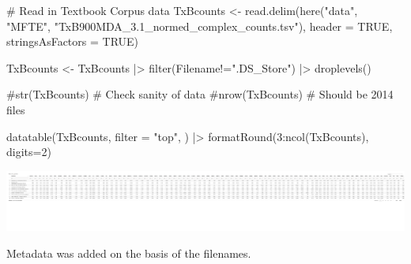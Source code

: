 \documentclass[
  letterpaper,
  DIV=11,
  numbers=noendperiod]{scrreprt}
\newenvironment{Shaded}{\begin{snugshade}}{\end{snugshade}}
\newcommand{\AttributeTok}[1]{\textcolor[rgb]{0.40,0.45,0.13}{#1}}
\newcommand{\CommentTok}[1]{\textcolor[rgb]{0.37,0.37,0.37}{#1}}
\newcommand{\ConstantTok}[1]{\textcolor[rgb]{0.56,0.35,0.01}{#1}}
\newcommand{\DecValTok}[1]{\textcolor[rgb]{0.68,0.00,0.00}{#1}}
\newcommand{\FunctionTok}[1]{\textcolor[rgb]{0.28,0.35,0.67}{#1}}
\newcommand{\NormalTok}[1]{\textcolor[rgb]{0.00,0.23,0.31}{#1}}
\newcommand{\OtherTok}[1]{\textcolor[rgb]{0.00,0.23,0.31}{#1}}
\newcommand{\SpecialCharTok}[1]{\textcolor[rgb]{0.37,0.37,0.37}{#1}}
\newcommand{\StringTok}[1]{\textcolor[rgb]{0.13,0.47,0.30}{#1}}
\begin{document}
\begin{Shaded}
\begin{Highlighting}[]
\CommentTok{\# Read in Textbook Corpus data}
\NormalTok{TxBcounts }\OtherTok{\textless{}{-}} \FunctionTok{read.delim}\NormalTok{(}\FunctionTok{here}\NormalTok{(}\StringTok{"data"}\NormalTok{, }\StringTok{"MFTE"}\NormalTok{, }\StringTok{"TxB900MDA\_3.1\_normed\_complex\_counts.tsv"}\NormalTok{), }\AttributeTok{header =} \ConstantTok{TRUE}\NormalTok{, }\AttributeTok{stringsAsFactors =} \ConstantTok{TRUE}\NormalTok{)}

\NormalTok{TxBcounts }\OtherTok{\textless{}{-}}\NormalTok{ TxBcounts }\SpecialCharTok{|\textgreater{}} 
  \FunctionTok{filter}\NormalTok{(Filename}\SpecialCharTok{!=}\StringTok{".DS\_Store"}\NormalTok{) }\SpecialCharTok{|\textgreater{}}  
  \FunctionTok{droplevels}\NormalTok{()}

\CommentTok{\#str(TxBcounts) \# Check sanity of data}
\CommentTok{\#nrow(TxBcounts) \# Should be 2014 files}

\FunctionTok{datatable}\NormalTok{(TxBcounts,}
  \AttributeTok{filter =} \StringTok{"top"}\NormalTok{,}
\NormalTok{) }\SpecialCharTok{|\textgreater{}} 
  \FunctionTok{formatRound}\NormalTok{(}\DecValTok{3}\SpecialCharTok{:}\FunctionTok{ncol}\NormalTok{(TxBcounts), }\AttributeTok{digits=}\DecValTok{2}\NormalTok{)}
\end{Highlighting}
\end{Shaded}

\includegraphics{AppendixE_files/figure-pdf/raw_data-1.pdf}

Metadata was added on the basis of the filenames.
\end{document}
